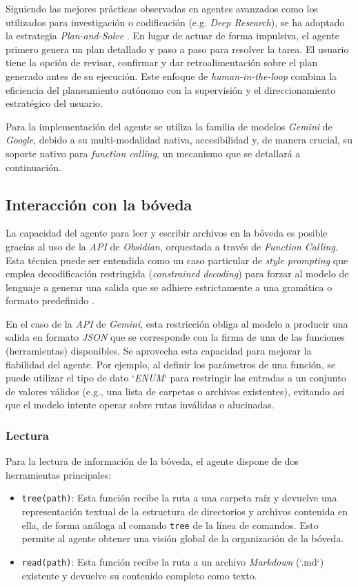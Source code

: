 Siguiendo las mejores prácticas observadas en agentes avanzados como los utilizados para investigación o codificación (e.g. \textit{Deep Research}), se ha adoptado la estrategia \textit{Plan-and-Solve} \parencite{wangPlanandSolvePromptingImproving2023}. En lugar de actuar de forma impulsiva, el agente primero genera un plan detallado y paso a paso para resolver la tarea. El usuario tiene la opción de revisar, confirmar y dar retroalimentación sobre el plan generado antes de su ejecución. Este enfoque de \textit{human-in-the-loop} combina la eficiencia del planeamiento autónomo con la supervisión y el direccionamiento estratégico del usuario.

Para la implementación del agente se utiliza la familia de modelos \textit{Gemini} de \textit{Google}, debido a su multi-modalidad nativa, accesibilidad y, de manera crucial, su soporte nativo para \textit{function calling}, un mecanismo que se detallará a continuación.

\subsection{Interacción con la bóveda}
La capacidad del agente para leer y escribir archivos en la bóveda es posible gracias al uso de la \textit{API} de \textit{Obsidian}, orquestada a través de \textit{Function Calling}. Esta técnica puede ser entendida como un caso particular de \textit{style prompting} que emplea decodificación restringida (\textit{constrained decoding}) para forzar al modelo de lenguaje a generar una salida que se adhiere estrictamente a una gramática o formato predefinido \parencite{gengGrammarConstrainedDecodingStructured2024}.

En el caso de la \textit{API} de \textit{Gemini}, esta restricción obliga al modelo a producir una salida en formato \textit{JSON} que se corresponde con la firma de una de las funciones (herramientas) disponibles. Se aprovecha esta capacidad para mejorar la fiabilidad del agente. Por ejemplo, al definir los parámetros de una función, se puede utilizar el tipo de dato `\textit{ENUM}` para restringir las entradas a un conjunto de valores válidos (e.g., una lista de carpetas o archivos existentes), evitando así que el modelo intente operar sobre rutas inválidas o alucinadas.

\subsubsection{Lectura}
Para la lectura de información de la bóveda, el agente dispone de dos herramientas principales:
\begin{itemize}
    \item \texttt{tree(path)}: Esta función recibe la ruta a una carpeta raíz y devuelve una representación textual de la estructura de directorios y archivos contenida en ella, de forma análoga al comando \texttt{tree} de la línea de comandos. Esto permite al agente obtener una visión global de la organización de la bóveda.
    \item \texttt{read(path)}: Esta función recibe la ruta a un archivo \textit{Markdown} (`.md`) existente y devuelve su contenido completo como texto.
\end{itemize}
 
